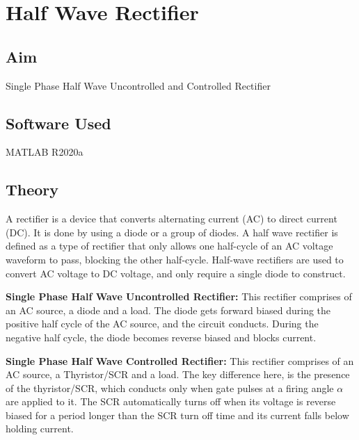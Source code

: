 \chapter{Half Wave Rectifier}
\vspace{-1cm}

\section{Aim}
\hspace{1cm}Single Phase Half Wave Uncontrolled and Controlled Rectifier

\section{Software Used}
\hspace{1cm}MATLAB R2020a
\section{Theory}
\hspace{\parindent}
A rectifier is a device that converts alternating current (AC) to direct
current (DC). It is done by using a diode or a group of diodes.
A half wave rectifier is defined as a type of rectifier that only allows
one half-cycle of an AC voltage waveform to pass, blocking the other
half-cycle. Half-wave rectifiers are used to convert AC voltage to DC
voltage, and only require a single diode to construct.

\hspace{\parindent}
\textbf{Single Phase Half Wave Uncontrolled Rectifier:}
This rectifier comprises of an AC source, a diode and a load. The
diode gets forward biased during the positive half cycle of the AC
source, and the circuit conducts. During the negative half cycle, the
diode becomes reverse biased and blocks current.

\hspace{\parindent}
\textbf{Single Phase Half Wave Controlled Rectifier:}
This rectifier comprises of an AC source, a Thyristor/SCR and a
load. The key difference here, is the presence of the thyristor/SCR,
which conducts only when gate pulses at a firing angle $ \alpha $ are applied
to it. The SCR automatically turns off when its voltage is reverse
biased for a period longer than the SCR turn off time and its current
falls below holding current.


